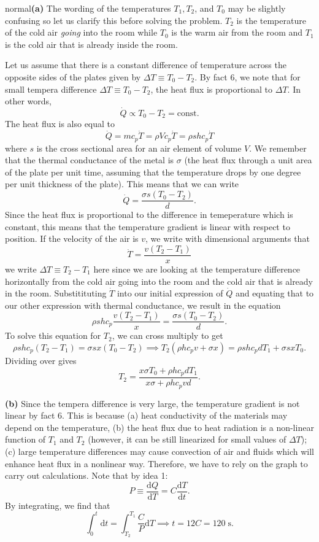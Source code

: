 \begin{solution}{normal}\textbf{(a)} The wording of the temperatures $T_1, T_2$, and $T_0$ may be slightly confusing so let us clarify this before solving the problem. $T_2$ is the temperature of the cold air \textit{going} into the room while $T_0$ is the warm air from the room and $T_1$ is the cold air that is already inside the room. 
\vspace{3mm}

\noindent Let us assume that there is a constant difference of temperature across the opposite sides of the plates given by $\Delta T \equiv T_0 - T_2$. By fact 6, we note that for small tempera difference $\Delta T \equiv T_0 - T_2$, the heat flux is proportional to $\Delta T$. In other words, 
\[\dot{Q} \propto T_0 - T_2 = \text{const}.\]
The heat flux is also equal to 
\[\dot{Q} = mc_p \dot{T} = \rho V c_p \dot{T} = \rho sh c_p \dot{T}\]
where $s$ is the cross sectional area for an air element of volume $V$. We remember that the thermal conductance of the metal is $\sigma$ (the heat flux through a unit area of the plate per unit time, assuming that the temperature drops by one degree per unit thickness of the plate). This means that we can write 
\[\dot{Q} = \frac{\sigma s (T_0 - T_2)}{d}.\]
Since the heat flux is proportional to the difference in temeperature which is constant, this means that the temperature gradient is linear with respect to position. If the velocity of the air is $v$, we write with dimensional arguments that 
\[\dot{T} = \frac{v (T_2 - T_1)}{x}\]
we write $\Delta T \equiv T_2 - T_1$ here since we are looking at the temperature difference horizontally from the cold air going into the room and the cold air that is already in the room. Substitituting $\dot{T}$ into our initial expression of $\dot{Q}$ and equating that to our other expression with thermal conductance, we result in the equation 
\[\rho s h c_p \frac{v (T_2 - T_1)}{x} = \frac{\sigma s (T_0 - T_2)}{d}.\]
To solve this equation for $T_2$, we can cross multiply to get 
\[\rho shc_p (T_2 - T_1) = \sigma s x(T_0 -T_2)\implies T_2(\rho hc_p v + \sigma x) = \rho shc_pd T_1 + \sigma sx T_0.\]
Dividing over gives
\[T_2 = \frac{x\sigma T_0 + \rho hc_pdT_1}{x\sigma + \rho hc_p vd}.\]
\vspace{3mm}

\noindent \textbf{(b)} Since the tempera difference is very large, the temperature gradient is not linear by fact 6. This is because (a) heat conductivity of the materials may depend on the temperature, (b) the heat flux due to heat radiation is a non-linear function of $T_1$ and $T_2$ (however, it can be still linearized for small values of $\Delta T$); (c) large temperature differences may cause convection of air and fluids which will enhance heat flux in a nonlinear way. Therefore, we have to rely on the graph to carry out calculations. Note that by idea 1:
\[P \equiv \frac{\text{d}Q}{\text{d}T} = C \frac{\text{d}T}{\text{d}t}.\]
By integrating, we find that 
\[\int_{0}^{t} \text{d}t = \int_{T_2}^{T_1}\frac{C}{P}\text{d}T\implies t = 12C = 120\;\mathrm{s}.\]
\end{solution}